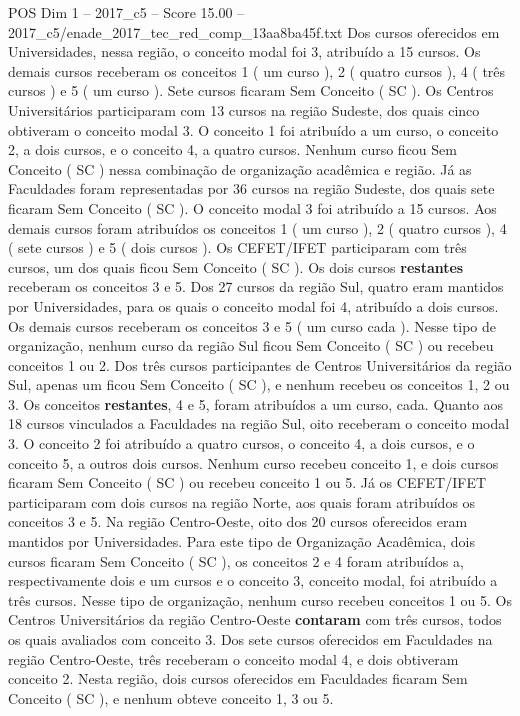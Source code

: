 \begin{textsample}{POS Dim 1 – 2017\_c5 – Score 15.00 – 2017\_c5/enade\_2017\_tec\_red\_comp\_13aa8ba45f.txt}
Dos cursos oferecidos em Universidades, nessa região, o conceito modal foi 3, atribuído a 15 cursos.
Os demais cursos receberam os conceitos 1 ( um curso ), 2 ( quatro cursos ), 4 ( três cursos ) e 5 ( um curso ).
Sete cursos ficaram Sem Conceito ( SC ).
Os Centros Universitários participaram com 13 cursos na região Sudeste, dos quais cinco obtiveram o conceito modal 3.
O conceito 1 foi atribuído a um curso, o conceito 2, a dois cursos, e o conceito 4, a quatro cursos.
Nenhum curso ficou Sem Conceito ( SC ) nessa combinação de organização acadêmica e região.
Já as Faculdades foram representadas por 36 cursos na região Sudeste, dos quais sete ficaram Sem Conceito ( SC ).
O conceito modal 3 foi atribuído a 15 cursos.
Aos demais cursos foram atribuídos os conceitos 1 ( um curso ), 2 ( quatro cursos ), 4 ( sete cursos ) e 5 ( dois cursos ).
Os CEFET/IFET participaram com três cursos, um dos quais ficou Sem Conceito ( SC ).
Os dois cursos \textbf{restantes} receberam os conceitos 3 e 5.
Dos 27 cursos da região Sul, quatro eram mantidos por Universidades, para os quais o conceito modal foi 4, atribuído a dois cursos.
Os demais cursos receberam os conceitos 3 e 5 ( um curso cada ).
Nesse tipo de organização, nenhum curso da região Sul ficou Sem Conceito ( SC ) ou recebeu conceitos 1 ou 2.
Dos três cursos participantes de Centros Universitários da região Sul, apenas um ficou Sem Conceito ( SC ), e nenhum recebeu os conceitos 1, 2 ou 3.
Os conceitos \textbf{restantes}, 4 e 5, foram atribuídos a um curso, cada.
Quanto aos 18 cursos vinculados a Faculdades na região Sul, oito receberam o conceito modal 3.
O conceito 2 foi atribuído a quatro cursos, o conceito 4, a dois cursos, e o conceito 5, a outros dois cursos.
Nenhum curso recebeu conceito 1, e dois cursos ficaram Sem Conceito ( SC ) ou recebeu conceito 1 ou 5.
Já os CEFET/IFET participaram com dois cursos na região Norte, aos quais foram atribuídos os conceitos 3 e 5.
Na região Centro-Oeste, oito dos 20 cursos oferecidos eram mantidos por Universidades.
Para este tipo de Organização Acadêmica, dois cursos ficaram Sem Conceito ( SC ), os conceitos 2 e 4 foram atribuídos a, respectivamente dois e um cursos e o conceito 3, conceito modal, foi atribuído a três cursos.
Nesse tipo de organização, nenhum curso recebeu conceitos 1 ou 5.
Os Centros Universitários da região Centro-Oeste \textbf{contaram} com três cursos, todos os quais avaliados com conceito 3.
Dos sete cursos oferecidos em Faculdades na região Centro-Oeste, três receberam o conceito modal 4, e dois obtiveram conceito 2.
Nesta região, dois cursos oferecidos em Faculdades ficaram Sem Conceito ( SC ), e nenhum obteve conceito 1, 3 ou 5.

\end{textsample}
